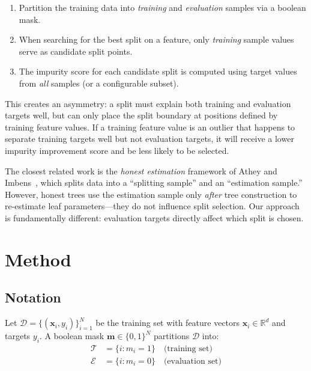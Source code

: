 \documentclass[11pt,a4paper]{article}
\begin{document}
\begin{enumerate}
    \item Partition the training data into \emph{training} and \emph{evaluation}
          samples via a boolean mask.
    \item When searching for the best split on a feature, only \emph{training}
          sample values serve as candidate split points.
    \item The impurity score for each candidate split is computed using target
          values from \emph{all} samples (or a configurable subset).
\end{enumerate}

This creates an asymmetry: a split must explain both training and evaluation
targets well, but can only place the split boundary at positions defined by
training feature values. If a training feature value is an outlier that happens
to separate training targets well but not evaluation targets, it will receive a
lower impurity improvement score and be less likely to be selected.

The closest related work is the \emph{honest estimation} framework of
Athey and Imbens~\cite{athey2016}, which splits data into a ``splitting sample'' and an
``estimation sample.'' However, honest trees use the estimation sample only
\emph{after} tree construction to re-estimate leaf parameters---they do not
influence split selection. Our approach is fundamentally different: evaluation
targets directly affect which split is chosen.

\section{Method}
\label{sec:method}

\subsection{Notation}

Let $\mathcal{D} = \{(\mathbf{x}_i, y_i)\}_{i=1}^{N}$ be the training set
with feature vectors $\mathbf{x}_i \in \mathbb{R}^d$ and targets $y_i$.
A boolean mask $\mathbf{m} \in \{0,1\}^N$ partitions $\mathcal{D}$ into:
\begin{align}
    \mathcal{T} &= \{i : m_i = 1\} \quad \text{(training set)} \\
    \mathcal{E} &= \{i : m_i = 0\} \quad \text{(evaluation set)}
\end{align}
\end{document}
